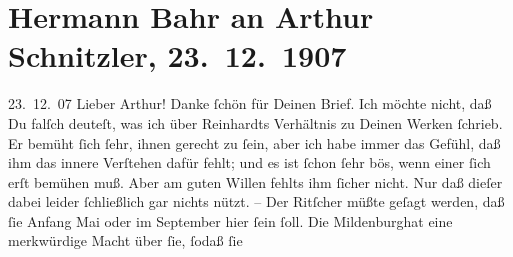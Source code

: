

         
         \renewcommand{\erwaehntePersonen}{Personen: Rosa Bahr, Anna Bahr-Mildenburg, Lucie Höflich, Max Reinhardt, Helene Ritscher, Eugenie von Roth, Olga Schnitzler, Alexander Strakosch}
         \renewcommand{\erwaehnteOrte}{Orte: Wien}
         \renewcommand{\erwaehnteWerke}{}
               \section[Hermann Bahr an Arthur Schnitzler, 23. 12. 1907]{ Hermann Bahr an Arthur Schnitzler, 23. 12. 1907}\nopagebreak{}\rehead{ }\begin{ledgroupsized}[t]{13cm}\normalsize\beginnumbering \toendnotes[C]{\smallbreak\pagebreak[2]} 
\toendnotes[C]{\smallbreak}\pstart
           \raggedleft{}{\pb}23. 12. 07\pend
           \pstart\center{}Lieber Arthur!\pend\pstart
           Danke ſchön für Deinen Brief. Ich möchte nicht, daß Du falſch deuteſt, was ich über
                  Reinhardts Verhältnis zu Deinen Werken
               ſchrieb. Er bemüht ſich ſehr, ihnen gerecht zu ſein, aber ich habe immer das Gefühl,
               daß ihm das innere Verſtehen dafür fehlt; und es ist ſchon ſehr bös, wenn einer ſich
               erſt bemühen muß. Aber am guten Willen fehlts ihm ſicher nicht. Nur daß dieſer dabei
               leider ſchließlich gar nichts nützt. – Der Ritſcher müßte geſagt werden, daß ſie Anfang Mai oder im September hier ſein
               ſoll. Die Mildenburghat eine merkwürdige Macht über ſie, ſodaß ſie

\end{ledgroupsized}
